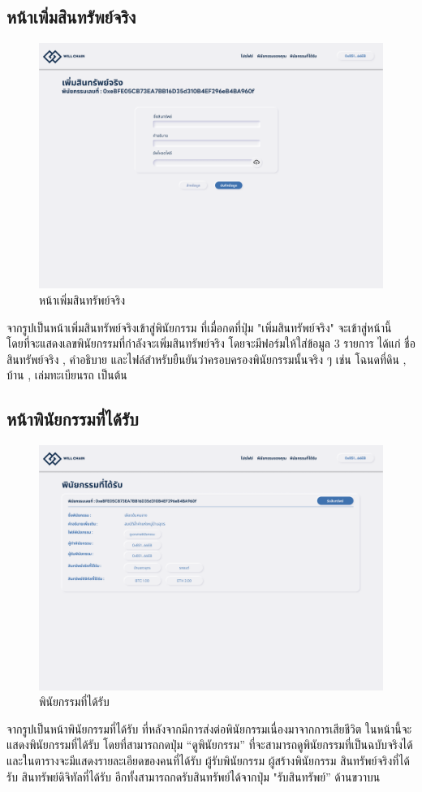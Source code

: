 \documentclass[12pt,oneside,openright,a4paper]{cpe-thai-project}
\begin{document}
\subsection{หน้าเพิ่มสินทรัพย์จริง}
		\begin{figure}[!thb]
			\centering
			\includegraphics[scale=0.2]{addRealAsset}
			\caption{หน้าเพิ่มสินทรัพย์จริง}
		\end{figure}
		\FloatBarrier
		\tab จากรูปเป็นหน้าเพิ่มสินทรัพย์จริงเข้าสู่พินัยกรรม ที่เมื่อกดที่ปุ่ม "เพิ่มสินทรัพย์จริง" จะเข้าสู่หน้านี้ โดยที่จะแสดงเลขพินัยกรรมที่กำลังจะเพิ่มสินทรัพย์จริง โดยจะมีฟอร์มให้ใส่ข้อมูล 3 รายการ ได้แก่ ชื่อสินทรัพย์จริง , คำอธิบาย และไฟล์สำหรับยืนยันว่าครอบครองพินัยกรรมนั้นจริง ๆ เช่น โฉนดที่ดิน , บ้าน , เล่มทะเบียนรถ เป็นต้น
\subsection{หน้าพินัยกรรมที่ได้รับ}
		\begin{figure}[!thb]
			\centering
			\includegraphics[scale=0.2]{claimWill}
			\caption{พินัยกรรมที่ได้รับ}
		\end{figure}
		\FloatBarrier
		\tab จากรูปเป็นหน้าพินัยกรรมที่ได้รับ ที่หลังจากมีการส่งต่อพินัยกรรมเนื่องมาจากการเสียชีวิต ในหน้านี้จะแสดงพินัยกรรมที่ได้รับ โดยที่สามารถกดปุ่ม “ดูพินัยกรรม” ที่จะสามารถดูพินัยกรรมที่เป็นฉบับจริงได้ และในตารางจะมีแสดงรายละเอียดของคนที่ได้รับ ผู้รับพินัยกรรม ผู้สร้างพินัยกรรม สินทรัพย์จริงที่ได้รับ สินทรัพย์ดิจิทัลที่ได้รับ อีกทั้งสามารถกดรับสินทรัพย์ได้จากปุ่ม "รับสินทรัพย์'' ด้านขวาบน
\end{document}
